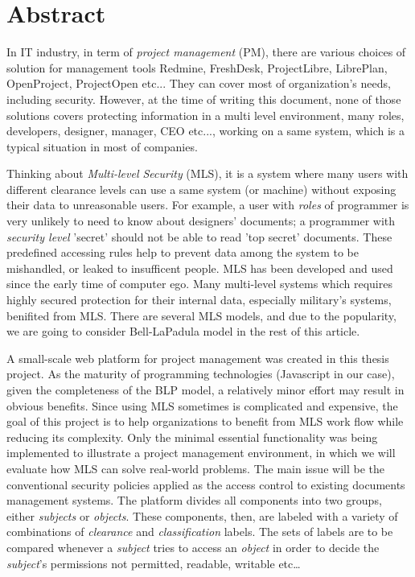 

\begingroup
\let\clearpage\relax
\let\cleardoublepage\relax
\let\cleardoublepage\relax

\chapter*{Abstract} %

In IT industry, in term of \emph{project management} (PM), there are various choices of solution for management tools \eg Redmine, FreshDesk, ProjectLibre, LibrePlan, OpenProject, ProjectOpen etc...
They can cover most of organization's needs, including security.
However, at the time of writing this document, none of those solutions covers protecting information in a multi level environment, \ie many roles, \eg developers, designer, manager, CEO etc..., working on a same system, which is a typical situation in most of companies. 

Thinking about \emph{Multi-level Security} (MLS), it is a system where many users with different clearance levels can use a same system (or machine) without exposing their data to unreasonable users.
For example, a user with \emph{roles} of programmer is very unlikely to need to know about designers' documents;
a programmer with \emph{security level} 'secret' should not be able to read 'top secret' documents.
These predefined accessing rules help to prevent data among the system to be mishandled, or leaked to insufficent people.
MLS has been developed and used since the early time of computer ego.
Many multi-level systems which requires highly secured protection for their internal data, especially military's systems, benifited from MLS.
There are several MLS models, and due to the popularity, we are going to consider Bell-LaPadula model in the rest of this article.

A small-scale web platform for project management was created in this thesis project.
As the maturity of programming technologies (\eg Javascript in our case), given the completeness of the BLP model, a relatively minor effort may result in obvious benefits.
Since using MLS sometimes is complicated and expensive, the goal of this project is to help organizations to benefit from MLS work flow while reducing its complexity.
Only the minimal essential functionality was being implemented to illustrate a project management environment, in which we will evaluate how MLS can solve real-world problems.
The main issue will be the conventional security policies applied as the access control to existing documents management systems.
The platform divides all components into two groups, either \emph{subjects} or \emph{objects}.
These components, then, are labeled with a variety of combinations of \emph{clearance} and \emph{classification} labels.
The sets of labels are to be compared whenever a \emph{subject} tries to access an \emph{object} in order to decide the \emph{subject}'s permissions \eg not permitted, readable, writable etc\dots

